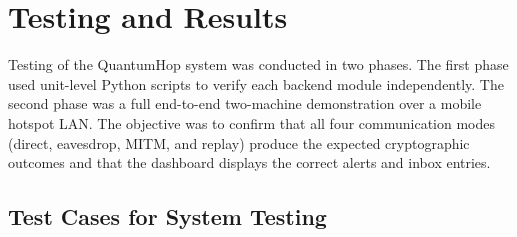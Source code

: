 \chapter{Testing and Results}

Testing of the QuantumHop system was conducted in two phases. The first phase used unit-level Python scripts to verify each backend module independently. The second phase was a full end-to-end two-machine demonstration over a mobile hotspot LAN. The objective was to confirm that all four communication modes (direct, eavesdrop, MITM, and replay) produce the expected cryptographic outcomes and that the dashboard displays the correct alerts and inbox entries.

\section{Test Cases for System Testing}

